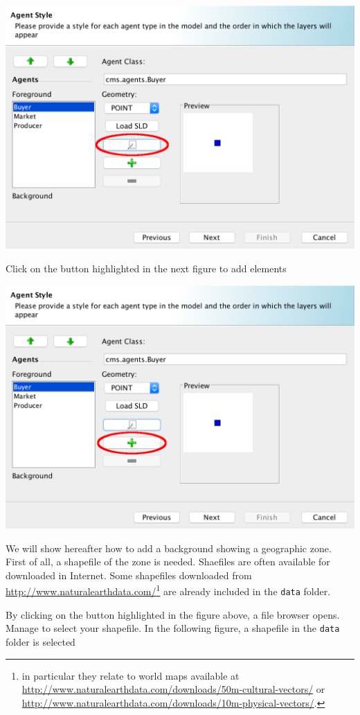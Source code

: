 \documentclass{article}
\begin{document}
\includegraphics[scale=0.35]{fig_cms_rs_gis4a}

Click on the button highlighted in the next figure to add elements

\includegraphics[scale=0.35]{fig_cms_rs_gis4b}

We will show hereafter how to add a background showing a geographic zone. First of all, a shapefile of the zone is needed.  
Shaefiles are often available for downloaded in Internet. Some shapefiles downloaded from \url{http://www.naturalearthdata.com/}\footnote{
	in particular they relate to world maps available at \url{http://www.naturalearthdata.com/downloads/50m-cultural-vectors/} or \url{http://www.naturalearthdata.com/downloads/10m-physical-vectors/}.} are already included in the \verb+data+ folder.

By clicking on the button highlighted in the figure above, a file browser opens. Manage to select your shapefile. In the following figure, a shapefile in the \verb+data+ folder is selected
\end{document}
